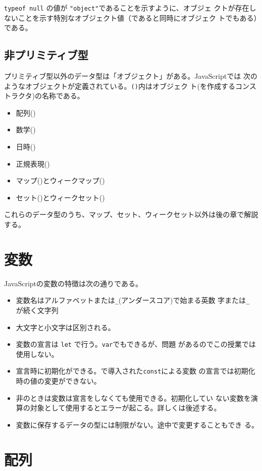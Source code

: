 \Verb+typeof null+ の値が \Verb+"object"+であることを示すように、オブジェ
クトが存在しないことを示す特別なオブジェクト値（であると同時にオブジェク
トでもある）である。
\subsection{非プリミティブ型}
プリミティブ型以外のデータ型は「オブジェクト」がある。JavaScriptでは
次のようなオブジェクトが定義されている。\texttt{()}内はオブジェク
ト(を作成するコンストラクタ)の名称である。
\begin{itemize}
 \item 配列()
 \item 数学()
 \item 日時()
 \item 正規表現()
 \item マップ()とウィークマップ()
 \item セット()とウィークセット()
\end{itemize}
これらのデータ型のうち、マップ、セット、ウィークセット以外は後の章で解説する。 
\section{変数}
JavaScriptの変数の特徴は次の通りである。
\begin{itemize}
 \item 変数名はアルファベットまたは\Verb+_+(アンダースコア)で始まる英数
       字または\Verb+_+ が続く文字列
 \item 大文字と小文字は区別される。
 \item 変数の宣言は \texttt{let} で行う。\texttt{var}でもできるが、問題
       があるのでこの授業では使用しない。
 \item 宣言時に初期化ができる。\ES で導入された\texttt{const}による変数
       の宣言では初期化時の値の変更ができない。
 \item 非\Strict のときは変数は宣言をしなくても使用できる。初期化してい
       ない変数を演算の対象として使用するとエラーが起こる。詳しくは後述する。
 \item 変数に保存するデータの型には制限がない。途中で変更することもでき
       る。
\end{itemize}
\section{配列}
